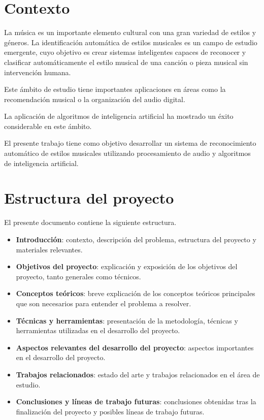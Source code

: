 
\section{Contexto}

La música es un importante elemento cultural con una gran variedad de estilos y géneros.
La identificación automática de estilos musicales es un campo de estudio emergente, cuyo objetivo es crear sistemas inteligentes capaces de reconocer y clasificar automáticamente el estilo musical de una canción o pieza musical sin intervención humana. 

Este ámbito de estudio tiene importantes aplicaciones en áreas como la recomendación musical \cite{https://doi.org/10.1049/el.2019.4202} o la organización del audio digital.

La aplicación de algoritmos de inteligencia artificial ha mostrado un éxito considerable en este ámbito.

El presente trabajo tiene como objetivo desarrollar un sistema de reconocimiento automático de estilos musicales utilizando procesamiento de audio y algoritmos de inteligencia artificial.

\section{Estructura del proyecto}
El presente documento contiene la siguiente estructura.

\begin{itemize}
\tightlist
\item \textbf{Introducción}: contexto, descripción del problema, estructura del proyecto y materiales relevantes.
\item \textbf{Objetivos del proyecto}: explicación y exposición de los objetivos del proyecto, tanto generales como técnicos.
\item \textbf{Conceptos teóricos}: breve explicación de los conceptos teóricos principales que son necesarios para entender el problema a resolver.
\item \textbf{Técnicas y herramientas}: presentación de la metodología, técnicas y herramientas utilizadas en el desarrollo del proyecto.
\item \textbf{Aspectos relevantes del desarrollo del proyecto}: aspectos importantes en el desarrollo del proyecto.
\item \textbf{Trabajos relacionados}: estado del arte y trabajos relacionados en el área de estudio.
\item \textbf{Conclusiones y líneas de trabajo futuras}: conclusiones obtenidas tras la finalización del proyecto y posibles líneas de trabajo futuras.
\end{itemize}

